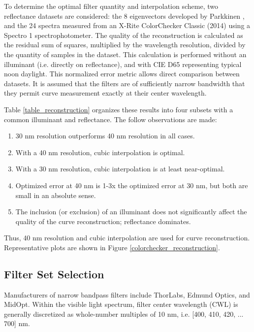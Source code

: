 \documentclass[twocolumn,10pt]{asme2ej}
\newcommand{\id}{\hspace{6 mm}}
\begin{document}
\id To determine the optimal filter quantity and interpolation scheme, two reflectance datasets are considered: the 8 eigenvectors developed by Parkkinen \cite{Parkkinen}, and the 24 spectra measured from an X-Rite ColorChecker Classic (2014) using a Spectro 1 spectrophotometer. The quality of the reconstruction is calculated as the residual sum of squares, multiplied by the wavelength resolution, divided by the quantity of samples in the dataset. This calculation is performed without an illuminant (i.e. directly on reflectance), and with CIE D65 representing typical noon daylight. This normalized error metric allows direct comparison between datasets. It is assumed that the filters are of sufficiently narrow bandwidth that they permit curve measurement exactly at their center wavelength.

\id Table \ref{table_reconstruction} organizes these results into four subsets with a common illuminant and reflectance. The follow observations are made:

\begin{enumerate}
  \item 30 nm resolution outperforms 40 nm resolution in all cases.
  \item With a 40 nm resolution, cubic interpolation is optimal.
  \item With a 30 nm resolution, cubic interpolation is at least near-optimal.
  \item Optimized error at 40 nm is 1-3x the optimized error at 30 nm, but both are small in an absolute sense.
  \item The inclusion (or exclusion) of an illuminant does not significantly affect the quality of the curve reconstruction; reflectance dominates.
\end{enumerate}

Thus, 40 nm resolution and cubic interpolation are used for curve reconstruction. Representative plots are shown in Figure \ref{colorchecker_reconstruction}.

\subsection{Filter Set Selection}

\label{section_filters}

Manufacturers of narrow bandpass filters include ThorLabs, Edmund Optics, and MidOpt. Within the visible light spectrum, filter center wavelength (CWL) is generally discretized as whole-number multiples of 10 nm, i.e. [400, 410, 420, ... 700] nm.
\end{document}

